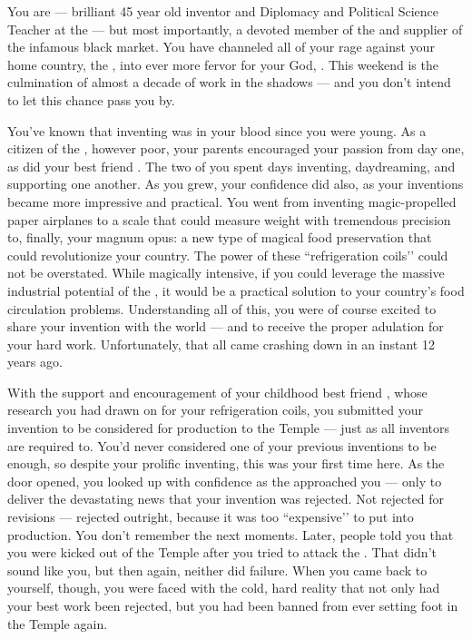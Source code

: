 \documentclass[char]{GL2020}
\begin{document}
\name{\cChupInventor{}}

You are \cChupInventor{\intro} — brilliant 45 year old inventor and Diplomacy and Political Science Teacher at the \pSchool{} — but most importantly, a devoted member of the \pGoaties{} and supplier of the infamous black market. You have channeled all of your rage against your home country, the \pTech{}, into ever more fervor for your God, \cGenesis{}. This weekend is the culmination of almost a decade of work in the shadows — and you don't intend to let this chance pass you by.

You've known that inventing was in your blood since you were young. As a citizen of the \pTech{}, however poor, your parents encouraged your passion from day one, as did your best friend \cHeadScientist{\full}. The two of you spent days inventing, daydreaming, and supporting one another. As you grew, your confidence did also, as your inventions became more impressive and practical. You went from inventing magic-propelled paper airplanes to a scale that could measure weight with tremendous precision to, finally, your magnum opus: a new type of magical food preservation that could revolutionize your country. The power of these ``refrigeration coils'’ could not be overstated. While magically intensive, if you could leverage the massive industrial potential of the \pTech{}, it would be a practical solution to your country's food circulation problems. Understanding all of this, you were of course excited to share your invention with the world — and to receive the proper adulation for your hard work. Unfortunately, that all came crashing down in an instant 12 years ago.

With the support and encouragement of your childhood best friend \cHeadScientist{}, whose research you had drawn on for your refrigeration coils, you submitted your invention to be considered for production to the Temple — just as all inventors are required to. You'd never considered one of your previous inventions to be enough, so despite your prolific inventing, this was your first time here. As the door opened, you looked up with confidence as the \cAntiChup{\cleric} approached you — only to deliver the devastating news that your invention was rejected. Not rejected for revisions — rejected outright, because it was too ``expensive'’ to put into production. You don't remember the next moments. Later, people told you that you were kicked out of the Temple after you tried to attack the \cAntiChup{\cleric}. That didn't sound like you, but then again, neither did failure. When you came back to yourself, though, you were faced with the cold, hard reality that not only had your best work been rejected, but you had been banned from ever setting foot in the Temple again.
\end{document}

